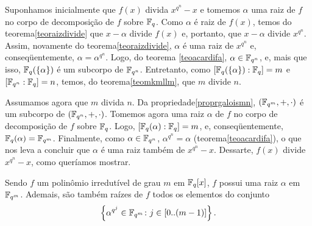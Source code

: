 \begin{dem}
  Suponhamos inicialmente que $f(x)$ divida $x^{q^n}-x$ e tomemos
  $\alpha$ uma raiz de $f$ no corpo de decomposição de $f$ sobre
  $\mathbb{F}_{q}$. Como $\alpha$ é raiz de $f(x)$, temos do
  teorema\xspace\ref{teoraizdivide} que $x-\alpha$ divide $f(x)$ e,
  portanto, que $x-\alpha$ divide $x^{q^n}$. Assim, novamente do
  teorema\xspace\ref{teoraizdivide}, $\alpha$ é uma raiz de $x^{q^n}$ e,
  conseqüentemente, $\alpha=\alpha^{q^n}$. Logo, do teorema
  \xspace\ref{teoacardifa},
  $\alpha\in\mathbb{F}_{q^n}$, e, mais que isso, $\mathbb{F}_{q}(\left\{ \alpha \right\})$ é
  um subcorpo de $\mathbb{F}_{q^n}$. Entretanto, como
  $[\mathbb{F}_{q}(\left\{ \alpha \right\}):\mathbb{F}_{q}]=m$ e
  $[\mathbb{F}_{q^n}:\mathbb{F}_{q}]=n$, temos, do
  teorema\xspace\ref{teomkmllm}, que $m$ divide $n$.

  Assumamos agora que $m$ divida $n$. Da
  propriedade\xspace\ref{proprgaloismn}, $(\mathbb{F}_{q^m},+,\cdot)$
  é um subcorpo de $(\mathbb{F}_{q^n},+,\cdot)$. Tomemos agora uma raiz
  $\alpha$ de $f$ no corpo de decomposição de $f$ sobre
  $\mathbb{F}_{q}$. Logo, $[\mathbb{F}_{q}(\alpha):\mathbb{F}_{q}]=m$, e,
  conseqüentemente, $\mathbb{F}_{q}(\alpha)=\mathbb{F}_{q^m}$. Finalmente,
  como $\alpha\in\mathbb{F}_{q^n}$,
  $\alpha^{q^n}=\alpha$ (teorema\xspace\ref{teoacardifa}),
  o que nos leva a concluir que $\alpha$ é uma
  raiz também de $x^{q^n}-x$. Dessarte, $f(x)$ divide $x^{q^n}-x$, como
  queríamos mostrar.
\end{dem}

\begin{Teo}\label{everyroot}
  Sendo $f$ um polinômio irredutível de grau $m$ em $\mathbb{F}_{q}[x]$, $f$
  possui uma raiz $\alpha$ em $\mathbb{F}_{q^m}$. Ademais, são também raízes
  de $f$ todos os elementos do conjunto
  \begin{equation*}
    \left\{ \alpha^{q^j}\in \mathbb{F}_{q^m}\colon j\in[0..(m-1)] \right\}\mathrm{.}
  \end{equation*}
\end{Teo}

